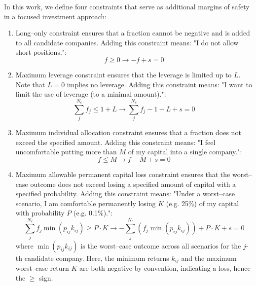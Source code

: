 \documentclass{article}
\begin{document}
\indent In this work, we define four constraints that serve as additional
margins of safety in a focused investment approach:
\begin{enumerate}
    \item Long--only constraint ensures that a fraction cannot be negative and
    is added to all candidate companies. Adding this constraint means: "I do not
    allow short positions.":
    \begin{equation}
        \label{eq:11}
            f \ge 0 \rightarrow -f + s = 0
        \end{equation}

    \item Maximum leverage constraint ensures that the leverage is limited up to
    $L$. Note that $L = 0$ implies no leverage. Adding this constraint means: "I
    want to limit the use of leverage (to a minimal amount).":
        \begin{equation}
        \label{eq:12}
            \sum_j^{N_c} f_j \le 1 + L \rightarrow \sum_j^{N_c} f_j - 1 - L + s = 0
        \end{equation}

    \item Maximum individual allocation constraint ensures that a fraction does
    not exceed the specified amount. Adding this constraint means: "I feel
    uncomfortable putting more than $M$ of my capital into a single company.":
        \begin{equation}
        \label{eq:13}
            f \le M \rightarrow f - M + s = 0
        \end{equation}

    \item Maximum allowable permanent capital loss constraint ensures that the
    worst--case outcome does not exceed losing a specified amount of capital
    with a specified probability. Adding this constraint means: "Under a
    worst--case scenario, I am comfortable permanently losing $K$ (e.g. 25\%) of
    my capital with probability $P$ (e.g. 0.1\%).":
        \begin{equation}
        \label{eq:14}
            \sum_j^{N_c} f_j \min(p_{ij} k_{ij}) \ge P \cdot K \rightarrow
            -\sum_j^{N_c} \left(f_j \min(p_{ij} k_{ij}) \right) + P \cdot K + s = 0
        \end{equation}
    \noindent where $\min(p_{ij} k_{ij})$ is the worst--case outcome across all
    scenarios for the $j$-th candidate company. Here, the minimum returns
    $k_{ij}$ and the maximum worst--case return $K$ are both negative by
    convention, indicating a loss, hence the $\ge$ sign.


\end{enumerate}
\end{document}
